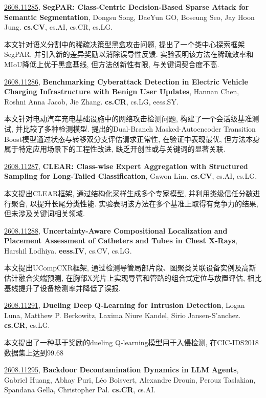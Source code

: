 \documentclass[9pt, a4paper]{article}
\theoremstyle{plain}
\theoremstyle{definition}
\theoremstyle{remark}
\newcommand{\arxivwithtarget}[3]{\hypertarget{#1}{}\href{https://arxiv.org/abs/#1}{#1}, \textbf{\textcolor{arxivblue}{#2}}, #3. }
\begin{document}
\arxivwithtarget{2608.11285}{SegPAR: Class-Centric Decision-Based Sparse Attack for Semantic Segmentation}{Dongsu Song, DaeYun GO, Boseung Seo, Jay Hoon Jung}\textbf{cs.CV}, cs.AI, cs.CR, cs.LG.

本文针对语义分割中的稀疏决策型黑盒攻击问题, 提出了一个类中心探索框架SegPAR, 并引入新的差异奖励以消除误导性反馈. 实验表明该方法在稀疏效率和MIoU降低上优于黑盒基线, 但方法创新性有限, 与关键词契合度不高.


\arxivwithtarget{2608.11286}{Benchmarking Cyberattack Detection in Electric Vehicle Charging Infrastructure with Benign User Updates}{Hannan Chen, Roshni Anna Jacob, Jie Zhang}\textbf{cs.CR}, cs.LG, eess.SY.

本文针对电动汽车充电基础设施中的网络攻击检测问题, 构建了一个会话级基准测试, 并比较了多种检测模型. 提出的Dual-Branch Masked-Autoencoder Transition Boost模型通过状态与转移双分支评估请求正常性, 在验证中表现最优, 但方法本身属于特定应用场景下的工程性改进, 缺乏开创性或与关键词的显著关联.


\arxivwithtarget{2608.11287}{CLEAR: Class-wise Expert Aggregation with Structured Sampling for Long-Tailed Classification}{Gawon Lim}\textbf{cs.CV}, cs.AI, cs.LG.

本文提出CLEAR框架, 通过结构化采样生成多个专家模型, 并利用类级信任分数进行聚合, 以提升长尾分类性能. 实验表明该方法在多个基准上取得有竞争力的结果, 但未涉及关键词相关领域.


\arxivwithtarget{2608.11288}{Uncertainty-Aware Compositional Localization and Placement Assessment of Catheters and Tubes in Chest X-Rays}{Harshil Lodhiya}\textbf{eess.IV}, cs.CV, cs.LG.

本文提出UCompCXR框架, 通过检测导管局部片段、图聚类关联设备实例及高斯估计融合尖端预测, 在胸部X光片上实现导管和管路的组合式定位与放置评估, 相比基线提升了设备检测率并降低了误报.


\arxivwithtarget{2608.11291}{Dueling Deep Q-Learning for Intrusion Detection}{Logan Luna, Matthew P. Berkowitz, Laxima Niure Kandel, Sirio Jansen-S'anchez}\textbf{cs.CR}, cs.LG.

本文提出了一种基于奖励的dueling Q-learning模型用于入侵检测, 在CIC-IDS2018数据集上达到99.68%


\arxivwithtarget{2608.11295}{Backdoor Decontamination Dynamics in LLM Agents}{Gabriel Huang, Abhay Puri, Léo Boisvert, Alexandre Drouin, Perouz Taslakian, Spandana Gella, Christopher Pal}\textbf{cs.CR}, cs.AI.
\end{document}
